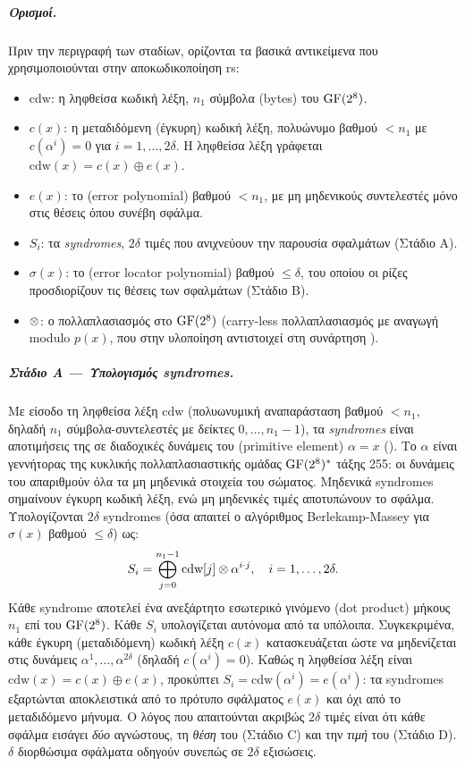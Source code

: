 \subparagraph{Ορισμοί.}
Πριν την περιγραφή των σταδίων, ορίζονται τα βασικά αντικείμενα που χρησιμοποιούνται στην αποκωδικοποίηση \gls{rs}:
\begin{itemize}
  \item $\text{cdw}$: η ληφθείσα κωδική λέξη, $n_1$ σύμβολα (bytes) του $\mathrm{GF}(2^8)$.
  \item $c(x)$: η μεταδιδόμενη (έγκυρη) κωδική λέξη, πολυώνυμο βαθμού $< n_1$ με $c(\alpha^i)=0$ για $i=1,\ldots,2\delta$. Η ληφθείσα λέξη γράφεται $\text{cdw}(x)=c(x)\oplus e(x)$.
  \item $e(x)$: το  (error polynomial) βαθμού $< n_1$, με μη μηδενικούς συντελεστές μόνο στις θέσεις όπου συνέβη σφάλμα.
  \item $S_i$: τα \emph{syndromes}, $2\delta$ τιμές που ανιχνεύουν την παρουσία σφαλμάτων (Στάδιο A).
  \item $\sigma(x)$: το  (error locator polynomial) βαθμού $\leq \delta$, του οποίου οι ρίζες προσδιορίζουν τις θέσεις των σφαλμάτων (Στάδιο B).
  \item $\otimes$: ο πολλαπλασιασμός στο $\mathrm{GF}(2^8)$ (carry-less πολλαπλασιασμός με αναγωγή modulo $p(x)$, που στην υλοποίηση αντιστοιχεί στη συνάρτηση ).
\end{itemize}

\subparagraph{Στάδιο A — Υπολογισμός syndromes.}
Με είσοδο τη ληφθείσα λέξη $\text{cdw}$ (πολυωνυμική αναπαράσταση βαθμού $< n_1$, δηλαδή $n_1$ σύμβολα-συντελεστές με δείκτες $0, \ldots, n_1-1$),
τα \emph{syndromes} είναι αποτιμήσεις της σε διαδοχικές δυνάμεις του  (primitive element) $\alpha = x$ (). Το $\alpha$ είναι γεννήτορας της κυκλικής πολλαπλασιαστικής ομάδας $\mathrm{GF}(2^8)^{*}$ τάξης 255: οι δυνάμεις του απαριθμούν όλα τα μη μηδενικά στοιχεία του σώματος.
Μηδενικά syndromes σημαίνουν έγκυρη κωδική λέξη, ενώ μη μηδενικές τιμές αποτυπώνουν
το σφάλμα. Υπολογίζονται $2\delta$ syndromes (όσα απαιτεί ο αλγόριθμος Berlekamp-Massey
για $\sigma(x)$ βαθμού $\leq \delta$) ως:
\begin{equation}
  S_i = \bigoplus_{j=0}^{n_1 - 1} \text{cdw}[j] \otimes \alpha^{i \cdot j},
  \quad i = 1, \ldots, 2\delta.
\end{equation}
Κάθε syndrome αποτελεί ένα ανεξάρτητο εσωτερικό γινόμενο (dot product)
μήκους $n_1$ επί του $\mathrm{GF}(2^8)$.
Κάθε $S_i$ υπολογίζεται αυτόνομα από τα υπόλοιπα. Συγκεκριμένα, κάθε έγκυρη (μεταδιδόμενη) κωδική λέξη $c(x)$ κατασκευάζεται ώστε να μηδενίζεται στις δυνάμεις $\alpha^1, \ldots, \alpha^{2\delta}$ (δηλαδή $c(\alpha^i) = 0$). Καθώς η ληφθείσα λέξη είναι $\text{cdw}(x) = c(x) \oplus e(x)$, προκύπτει $S_i = \text{cdw}(\alpha^i) = e(\alpha^i)$: τα syndromes εξαρτώνται αποκλειστικά από το πρότυπο σφάλματος $e(x)$ και όχι από το μεταδιδόμενο μήνυμα. Ο λόγος που απαιτούνται ακριβώς $2\delta$ τιμές είναι ότι κάθε σφάλμα εισάγει \emph{δύο} αγνώστους, τη \emph{θέση} του (Στάδιο C) και την \emph{τιμή} του (Στάδιο D). $\delta$ διορθώσιμα σφάλματα οδηγούν συνεπώς σε $2\delta$ εξισώσεις.

